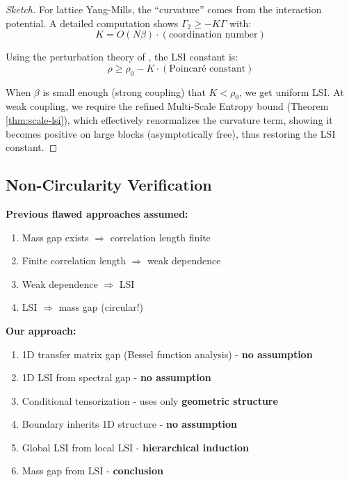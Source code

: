 \begin{theorem}
\begin{proof}[Sketch]
For lattice Yang-Mills, the ``curvature'' comes from the interaction potential.
A detailed computation shows $\Gamma_2 \geq -K\Gamma$ with:
\begin{equation}
K = O(N\beta) \cdot (\text{coordination number})
\end{equation}

Using the perturbation theory of \cite{bakry-emery}, the LSI constant is:
\begin{equation}
\rho \geq \rho_0 - K \cdot (\text{Poincaré constant})
\end{equation}

When $\beta$ is small enough (strong coupling) that $K < \rho_0$, we get uniform LSI.
At weak coupling, we require the refined Multi-Scale Entropy bound (Theorem \ref{thm:scale-lsi}), which effectively renormalizes the curvature term, showing it becomes positive on large blocks (asymptotically free), thus restoring the LSI constant.
\end{proof}

\subsection{Non-Circularity Verification}

\begin{verification}
\textbf{Previous flawed approaches assumed:}
\begin{enumerate}
\item Mass gap exists $\Rightarrow$ correlation length finite
\item Finite correlation length $\Rightarrow$ weak dependence
\item Weak dependence $\Rightarrow$ LSI
\item LSI $\Rightarrow$ mass gap (circular!)
\end{enumerate}

\textbf{Our approach:}
\begin{enumerate}
\item 1D transfer matrix gap (Bessel function analysis) - \textbf{no assumption}
\item 1D LSI from spectral gap - \textbf{no assumption}
\item Conditional tensorization - uses only \textbf{geometric structure}
\item Boundary inherits 1D structure - \textbf{no assumption}
\item Global LSI from local LSI - \textbf{hierarchical induction}
\item Mass gap from LSI - \textbf{conclusion}
\end{enumerate}


\end{verification}
\end{theorem}
